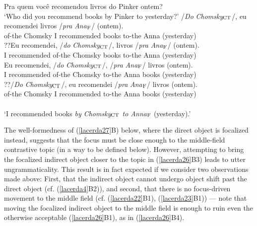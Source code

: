 \documentclass[output=paper]{langscibook}
\begin{document}
\begin{exe}
\ex \label{lacerda26}
\begin{xlist}
 \label{lacerda26A}
Pra quem você recomendou livros do Pinker ontem?\\
‘Who did you recommend books by Pinker to yesterday?’
 \label{lacerda26B1}
\gll /\emph{Do} 	\emph{Chomsky}$_{\textnormal{CT}}$/, 	eu 	recomendei 	livros 	/\emph{pra} 	\emph{Ana}$_{\textnormal{F}}$/	(ontem).\\
of-the 	Chomsky 	I 	recommended 	books 	to-the 	Anna	(yesterday)\\

 \label{lacerda26B2}
\gll ??Eu 	recomendei, 	/\emph{do} 	\emph{Chomsky}$_{\textnormal{CT}}$/, 	livros 	/\emph{pra} 	\emph{Ana}$_{\textnormal{F}}$/ 	(ontem).\\
I 	recommended 	of-the 	Chomsky 	books 	to-the 	Anna	(yesterday)\\

 \label{lacerda26B3}
\gll *Eu 	recomendei, 	/\emph{do} 	\emph{Chomsky}$_{\textnormal{CT}}$/, 	/\emph{pra} \emph{Ana}$_{\textnormal{F}}$/	livros	(ontem).\\
I 	recommended 	of-the 	Chomsky 	to-the 	Anna 	books	(yesterday)\\


 \label{lacerda26B4}
\gll ??/\emph{Do} 	\emph{Chomsky}$_{\textnormal{CT}}$/, 	eu 	recomendei 	/\emph{pra} \emph{Ana}$_{\textnormal{F}}$/ 	livros 	(ontem).\\
of-the 	Chomsky 	I 	recommended 	to-the 	Anna 	books 	(yesterday)\\\\
‘I recommended books \emph{by Chomsky$_{\textnormal{CT}}$ to Anna$_{\textnormal{F}}$} (yesterday).’
\end{xlist}
\end{exe}

The well-formedness of (\ref{lacerda27}B) below, where the direct object is focalized instead, suggests that the focus must be close enough to the middle-field contrastive topic (in a way to be defined below). However, attempting to bring the focalized indirect object closer to the topic in (\ref{lacerda26}B3) leads to utter ungrammaticality. This result is in fact expected if we consider two observations made above: First, that the indirect object cannot undergo object shift past the direct object (cf. (\ref{lacerda4}B2)), and second, that there is no focus-driven movement to the middle field (cf. (\ref{lacerda22}B1), (\ref{lacerda23}B1)) — note that moving the focalized indirect object to the middle field is enough to ruin even the otherwise acceptable (\ref{lacerda26}B1), as in (\ref{lacerda26}B4).
\end{document}
